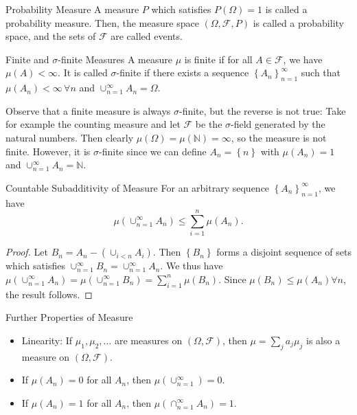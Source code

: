 \documentclass[avery5371,grid]{flashcards}
\begin{document}
\begin{flashcard}[Definition]{Probability Measure}
 A measure $P$ which satisfies $P\left( \Omega \right) = 1$ is called a probability measure. Then,
 the measure space $\left( \Omega,\mathcal{F},P \right)$ is called a probability space,
 and the sets of $\mathcal{F}$ are called events.
\end{flashcard}

\begin{flashcard}[Definition]{Finite and $\sigma$-finite Measures}
\scriptsize
A measure $\mu$ is finite if for all $A \in \mathcal{F}$, we have $\mu\left( A \right) < \infty$. It is called
$\sigma$-finite if there exists a sequence $\left\{ A_n \right\}_{n=1}^\infty$ such that $\mu\left( A_n \right) < \infty \, \forall n$
and $\cup_{n=1}^\infty A_n = \Omega$. 

Observe that a finite measure is always 
$\sigma$-finite, but the reverse is not true: Take for example the counting measure and let $\mathcal{F}$ be the $\sigma$-field generated by the natural 
numbers. Then clearly $\mu\left( \Omega \right) = \mu\left( \mathbb{N} \right) = \infty$, so 
the measure is not finite. However, it is $\sigma$-finite since we can define $A_n = \left\{  n \right\}$ with $\mu\left( A_n \right) =1$
and $\cup_{n=1}^\infty A_n = \mathbb{N}$.
\end{flashcard}

\begin{flashcard}[Theorem]{Countable Subadditivity of Measure}
 For an arbitrary sequence $\left\{ A_n \right\}_{n=1}^\infty$, we have
 \[
 \mu\left( \cup_{n=1}^\infty A_n \right) \le \sum_{i=1}^n \mu\left( A_n \right).
 \]
 \scriptsize
 \begin{proof}
  Let $B_n = A_n - \left( \cup_{i < n} A_i \right)$. Then $\left\{ B_n \right\}$ forms
  a disjoint sequence of sets which satisfies $\cup_{n=1}^\infty B_n = \cup_{n=1}^\infty A_n$. We thus have
  $ \mu\left( \cup_{n=1}^\infty A_n \right) =  \mu\left( \cup_{n=1}^\infty B_n \right) = \sum_{i=1}^n \mu\left( B_n \right)$.
  Since $\mu\left( B_n \right) \le \mu\left( A_n \right) \forall n$, the result follows.
 \end{proof}

\end{flashcard}

\begin{flashcard}[Theorem]{Further Properties of Measure}
 \begin{itemize}
  \item Linearity: If $\mu_1, \mu_2, \ldots$ are measures on $\left( \Omega,\mathcal{F} \right)$,
  then $\mu = \sum_j a_j \mu_j $ is also a measure on $\left( \Omega,\mathcal{F} \right)$.
  \item If $\mu(A_n) = 0$ for all $A_n$, then $\mu(\cup_{n=1}^\infty) = 0$.
  \item If $\mu(A_n) = 1$ for all $A_n$, then $\mu\left( \cap_{n=1}^\infty A_n \right) = 1$.
 \end{itemize}

\end{flashcard}
\end{document}

